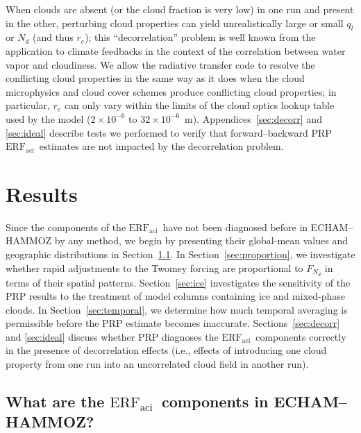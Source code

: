 \documentclass[acp, manuscript]{copernicus}\usepackage[]{graphicx}\usepackage[]{color}
\newcommand\nd{\ensuremath{N_d}}
\newcommand\erfaci{\ensuremath{\text{ERF}_\text{aci}}}
\begin{document}
When clouds are absent (or the cloud fraction is very low) in one run and
present in the other, perturbing cloud properties can yield unrealistically
large or small $q_l$ or $N_d$ (and thus $r_e$); this ``decorrelation'' problem
is well known from the application to climate feedbacks \citep{Colman1997} in
the context of the correlation between water vapor and cloudiness.  We allow the
radiative transfer code to resolve the conflicting cloud properties in the same
way as it does when the cloud microphysics and cloud cover schemes produce
conflicting cloud properties; in particular, $r_e$ can only vary within the
limits of the cloud optics lookup table used by the model ($2\times10^{-6}$ to
$32\times10^{-6}$~\unit{m}).  Appendices~\ref{sec:decorr} and \ref{sec:ideal}
describe tests we performed to verify that forward--backward PRP \erfaci\
estimates are not impacted by the decorrelation problem.

\section{Results}
\label{sec:experiments}

Since the components of the \erfaci\ have not been diagnosed before in
ECHAM--HAMMOZ by any method, we begin by presenting their global-mean values and
geographic distributions in Section~\ref{sec:fsst}.  In
Section~\ref{sec:proportion}, we investigate whether rapid adjustments to the
Twomey forcing are proportional to $F_{\nd}$ in terms of their spatial patterns.
Section~\ref{sec:ice} investigates the sensitivity of the PRP results to the
treatment of model columns containing ice and mixed-phase clouds. In
Section~\ref{sec:temporal}, we determine how much temporal averaging is permissible
before the PRP estimate becomes inaccurate.  Sections~\ref{sec:decorr} and
\ref{sec:ideal} discuss whether PRP diagnoses the \erfaci\ components correctly
in the presence of decorrelation effects (i.e., effects of introducing one cloud
property from one run into an uncorrelated cloud field in another run).

\subsection{What are the \erfaci\ components in ECHAM--HAMMOZ?}
\label{sec:fsst}
\end{document}
